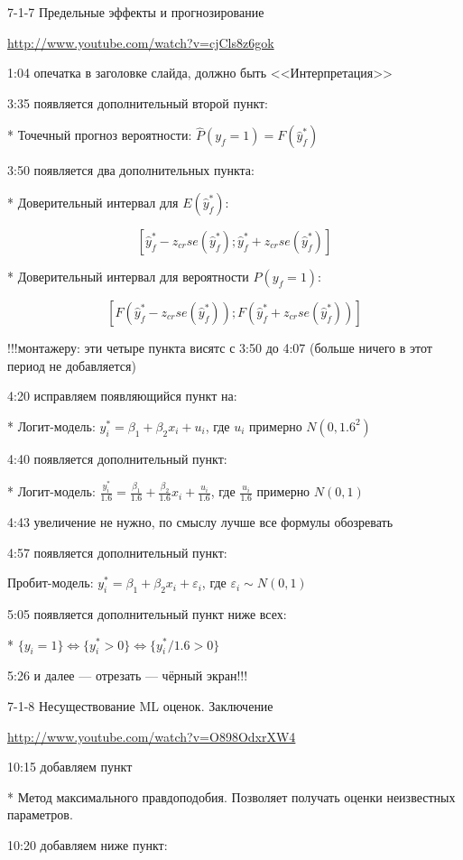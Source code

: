 \documentclass[12pt,a4paper]{article}\usepackage[]{graphicx}\usepackage[]{color}
\newcommand{\e}{\varepsilon}
\begin{document}
7-1-7 Предельные эффекты и прогнозирование

\url{http://www.youtube.com/watch?v=cjCls8z6gok}

1:04 опечатка в заголовке слайда, должно быть <<Интерпретация>>

3:35 появляется дополнительный второй пункт:

* Точечный прогноз вероятности: $\hat{P}(y_f=1)=F(\hat{y}^*_f)$

3:50 появляется два дополнительных пункта:

* Доверительный интервал для $E(\hat{y}^*_f)$:

\[
[\hat{y}^*_f-z_{cr}se(\hat{y}^*_f);\hat{y}^*_f+z_{cr}se(\hat{y}^*_f)]
\]

* Доверительный интервал для вероятности $P(y_f=1)$:

\[
[F(\hat{y}^*_f-z_{cr}se(\hat{y}^*_f));F(\hat{y}^*_f+z_{cr}se(\hat{y}^*_f))]
\]

!!!монтажеру: эти четыре пункта висятс с 3:50 до 4:07 (больше ничего в этот период не добавляется)


4:20 исправляем появляющийся пункт на:

* Логит-модель: $y^*_i=\beta_1+\beta_2 x_i + u_i$, 
где $u_i$ примерно $N(0,1.6^2)$

4:40 появляется дополнительный пункт:

* Логит-модель: $\frac{y^*_i}{1.6}=\frac{\beta_1}{1.6}+\frac{\beta_2}{1.6} x_i + \frac{u_i}{1.6}$,
где $ \frac{u_i}{1.6}$ примерно $N(0,1)$

4:43 увеличение не нужно, по смыслу лучше все формулы обозревать

4:57 появляется дополнительный пункт:

Пробит-модель: $y^*_i=\beta_1+\beta_2 x_i +\e_i$,
где $\e_i \sim N(0,1)$

5:05 появляется дополнительный пункт ниже всех:

* $\{y_i=1\} \Leftrightarrow \{y_i^*>0\} \Leftrightarrow \{y_i^*/1.6>0\}$ 

5:26 и далее --- отрезать --- чёрный экран!!!

7-1-8 Несуществование ML оценок. Заключение

\url{http://www.youtube.com/watch?v=O898OdxrXW4}

10:15 добавляем пункт

* Метод максимального правдоподобия. Позволяет получать оценки неизвестных параметров.

10:20 добавляем ниже пункт:
\end{document}
